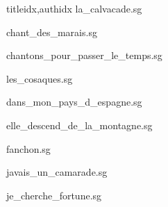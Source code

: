 \documentclass[
    ]{article}
\begin{document}
\begin{songs}{titleidx,authidx}
{la_calvacade.sg}


{chant_des_marais.sg}


{chantons_pour_passer_le_temps.sg}


{les_cosaques.sg}


{dans_mon_pays_d_espagne.sg}


{elle_descend_de_la_montagne.sg}


{fanchon.sg}


{javais_un_camarade.sg}


{je_cherche_fortune.sg}


\end{songs}
\end{document}
